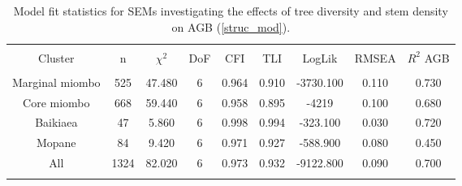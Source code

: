
\begin{table}[!htbp] \centering 
  \caption{Model fit statistics for SEMs investigating the effects of tree diversity and stem density on AGB (\autoref{struc_mod}).} 
  \label{struc_model_fit_clust_stats} 
\begin{tabular}{@{\extracolsep{0pt}} ccccccccc} 
\\[-1.8ex]\hline 
\hline \\[-1.8ex] 
{Cluster} & {n} & {$\chi^{2}$} & {DoF} & {CFI} & {TLI} & {LogLik} & {RMSEA} & {$R^{2}$ AGB} \\
\hline \\[-1.8ex] 
Marginal miombo & 525 & 47.480 & 6 & 0.964 & 0.910 & -3730.100 & 0.110 & 0.730 \\ 
Core miombo & 668 & 59.440 & 6 & 0.958 & 0.895 & -4219 & 0.100 & 0.680 \\ 
Baikiaea & 47 & 5.860 & 6 & 0.998 & 0.994 & -323.100 & 0.030 & 0.720 \\ 
Mopane & 84 & 9.420 & 6 & 0.971 & 0.927 & -588.900 & 0.080 & 0.450 \\ 
All & 1324 & 82.020 & 6 & 0.973 & 0.932 & -9122.800 & 0.090 & 0.700 \\ 
\hline \\[-1.8ex] 
\end{tabular} 
\end{table} 
